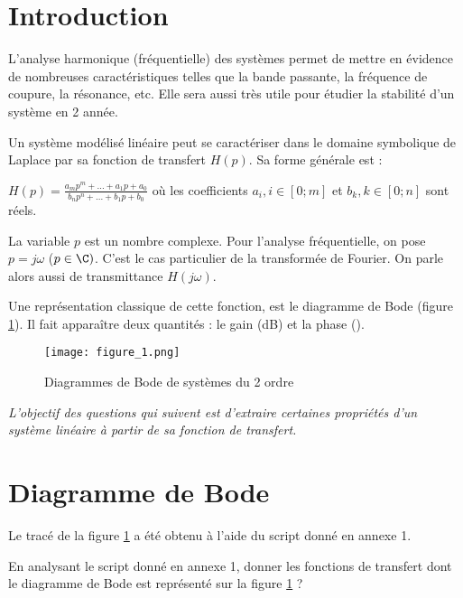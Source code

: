 
\section{Introduction}

L'analyse harmonique (fréquentielle) des systèmes permet de mettre en évidence de nombreuses caractéristiques telles que la bande passante, la fréquence de coupure, la résonance, etc.
Elle sera aussi très utile pour étudier la stabilité d'un système en 2 année.

Un système modélisé linéaire peut se caractériser dans le domaine symbolique de Laplace par sa fonction de transfert $H(p)$. Sa forme générale est :

$H(p) = \frac{{{a_m}{p^m} + ... + {a_1}p + {a_0}}}{{{b_n}{p^n} + ... + {b_1}p + {b_0}}}$ où les coefficients $a_i, i \in [0;m]$ et $b_k, k \in [0;n]$ sont réels.

La variable $p$ est un nombre complexe. Pour l'analyse fréquentielle, on pose $p=j \omega$ ($p\in \C)$. C'est le cas particulier de la transformée de Fourier. On parle alors aussi de transmittance $H(j \omega)$.

Une représentation classique de cette fonction, est le diagramme de Bode (figure \ref{Fig1}). Il fait apparaître deux quantités : le gain (dB) et la phase (\degres).

\begin{figure}[!h]
\begin{center}
\texttt{[image: figure\_1.png]} 
\caption{\label{Fig1} Diagrammes de Bode de systèmes du 2 ordre}
\end{center}
\end{figure}

\begin{dBox}
\textit{L'objectif des questions qui suivent est d'extraire certaines propriétés d'un système linéaire à partir de sa fonction de transfert.}
\end{dBox}


\section{Diagramme de Bode}

Le tracé de la figure \ref{Fig1} a été obtenu à l'aide du script donné en annexe 1.

\begin{tBox}
\question{} En analysant le script donné en annexe 1, donner les fonctions de transfert dont le diagramme de Bode est représenté sur la figure \ref{Fig1} ?
\end{tBox}

